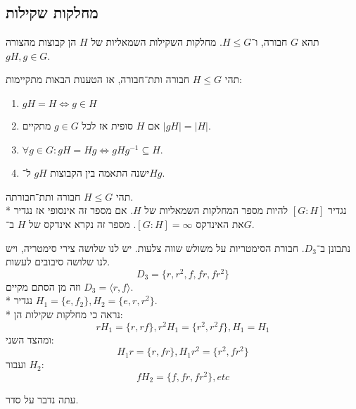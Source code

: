 \subsection{מחלקות שקילות}
\begin{definition}
	תהא $G$ חבורה, ו־$H \le G$.
	מחלקות השקילות השמאליות של $H$ הן קבוצות מהצורה $g H, g \in G$.
\end{definition}
\begin{lemma}
	תהי $H \le G$ חבורה ותת־חבורה, אז הטענות הבאות מתקיימות:
	\begin{enumerate}
		\item $gH = H \iff g \in H$
		\item אם $H$ סופית אז לכל $g \in G$ מתקיים $|g H| = |H|$.
		\item $\forall g \in G : g H = H g \iff g H g^{-1} \subseteq H$.
		\item ישנה התאמה בין הקבוצות $g H$ ל־$H g$.
	\end{enumerate}
\end{lemma}
\begin{definition}[אינדקס]
	תהי $H \le G$ חבורה ותת־חבורתה. \\*
	נגדיר $[G : H]$ להיות מספר המחלקות השמאליות של $H$.
	אם מספר זה אינסופי אז נגדיר את האינדקס $[G : H] = \infty$.
	מספר זה נקרא אינדקס של $H$ ב־$G$.
\end{definition}
\begin{example}
	נתבונן ב־$D_3$.
	חבורת הסימטריות על משולש שווה צלעות.
	יש לנו שלושה צירי סימטריה, ויש לנו שלושה סיבובים לעשות.
	\[
		D_3 = \{ r, r^2, f, fr, fr^2 \}
	\]
	וזה מן הסתם מקיים $D_3 = \langle r, f \rangle$. \\*
	נגדיר $H_1 = \{e, f_2\}, H_2 = \{e, r, r^2\}$. \\*
	נראה כי מחלקות שקילות הן:
	\[
		r H_1 = \{ r, rf \},
		r^2 H_1 = \{ r^2, r^2f \},
		H_1 = H_1
	\]
	ומהצד השני:
	\[
		H_1 r = \{ r, fr \},
		H_1 r^2 = \{ r^2, f r^2 \}
	\]
	ועבור $H_2$:
	\[
		f H_2 = \{ f, fr, fr^2 \}, etc
	\]
\end{example}
עתה נדבר על סדר.
